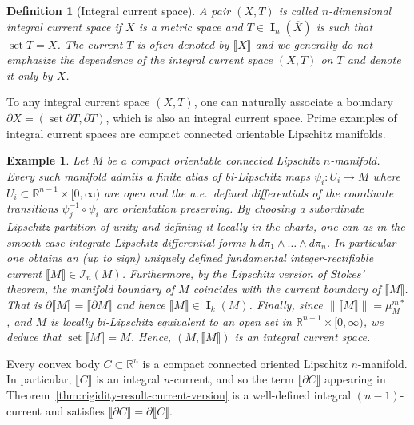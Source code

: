 \documentclass[reqno]{amsart}
\newtheorem{definition}[theorem]{Definition}
\newtheorem{example}[theorem]{Example}
\numberwithin{equation}{section}
\newcommand{\R}{\mathbb{R}}
\newcommand{\norm}[1]{\lVert#1\rVert}
\newcommand{\bb}[1]{\llbracket #1\rrbracket}
\DeclareMathOperator{\bI}{\mathbf{I}}
\DeclareMathOperator{\set}{set}
\begin{document}
\begin{definition}[Integral current space]\label{def:int_current_space}
A pair \((X, T)\) is called \(n\)-dimensional integral current space if \(X\) is a metric space and \(T\in \bI_n(\overline{X})\) is such that \(\set T =X\). The current \(T\) is often denoted by \(\bb{X}\) and we generally do not emphasize the dependence of the integral current space \((X, T)\) on \(T\) and denote it only by \(X\).
\end{definition}

To any integral current space \((X, T)\), one can naturally associate a boundary \(\partial X=(\set \partial T, \partial T)\), which is also an integral current space. Prime examples of integral current spaces are compact connected orientable Lipschitz manifolds.
\begin{example}
Let $M$ be a compact orientable connected Lipschitz $n$-manifold. Every such manifold admits a finite atlas of bi-Lipschitz maps $\psi_i \colon U_i \to M$ where $U_i\subset \R^{n-1}\times [0,\infty)$ are open and the a.e.\ defined differentials of the coordinate transitions $\psi_j^{-1}\circ \psi_i$ are orientation preserving. By choosing a subordinate Lipschitz partition of unity and defining it locally in the charts, one can as in the smooth case integrate Lipschitz differential forms $h \, d\pi_1 \wedge \dots \wedge d\pi_n$. In particular one obtains an (up to sign) uniquely defined fundamental integer-rectifiable current $\bb{M}\in \mathcal{I}_n(M)$. Furthermore, by the Lipschitz version of Stokes' theorem, the manifold boundary of $M$ coincides with the current boundary of $\bb{M}$. That is $\partial \bb{M}= \bb{\partial M}$ and hence $\bb{M}\in \bI_k(M)$. Finally, since $\norm{\bb{M}}=\mu^{m*}_M$, and $M$ is locally bi-Lipschitz equivalent to an open set in $\R^{n-1}\times [0,\infty)$, we deduce that $\set  \bb{M}=M$. Hence, $(M,\bb{M})$ is an integral current space.
\end{example}

Every convex body \(C\subset \R^n\) is a compact connected oriented Lipschitz \(n\)-manifold. In particular, \(\bb{C}\) is an integral \(n\)-current,  and so the term \(\bb{\partial C}\) appearing in Theorem~\ref{thm:rigidity-result-current-version} is a well-defined integral \((n-1)\)-current and satisfies \(\bb{\partial C}= \partial \bb{C}\). 

\end{document}

